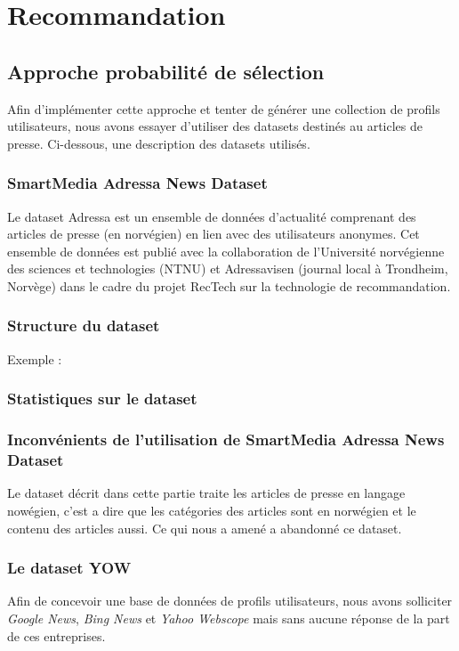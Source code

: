 \section{Recommandation}
\subsection{Approche probabilité de sélection}  
Afin d'implémenter cette approche et tenter de générer une collection de profils utilisateurs, nous avons essayer d'utiliser des datasets destinés au articles de presse. Ci-dessous, une description des datasets utilisés.

\subsubsection{SmartMedia Adressa News Dataset}
Le dataset Adressa est un ensemble de données d'actualité comprenant des articles de presse (en norvégien) en lien avec des utilisateurs anonymes. Cet ensemble de données est publié avec la collaboration de l'Université norvégienne des sciences et technologies (NTNU) et Adressavisen (journal local à Trondheim, Norvège) dans le cadre du projet RecTech sur la technologie de recommandation.\cite{refnorvege}

\subsubsection{Structure du dataset}


Exemple :


\subsubsection{Statistiques sur le dataset}


\subsubsection{Inconvénients de l'utilisation de \textquotedbl SmartMedia Adressa News Dataset\textquotedbl}

Le dataset décrit dans cette partie traite les articles de presse en langage nowégien, c'est a dire que les catégories des articles sont en norwégien et le contenu des articles aussi. Ce qui nous a amené a abandonné ce dataset.
  
\subsubsection{Le dataset \textquotedbl YOW \textquotedbl}
Afin de concevoir une base de données de profils utilisateurs, nous avons solliciter \emph{Google News}, \emph{Bing News} et \emph{Yahoo Webscope} mais sans aucune réponse de la part de ces entreprises. 

